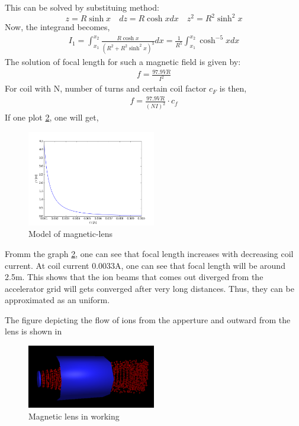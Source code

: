 \documentclass[twocolumn,12pt]{article}
\numberwithin{equation}{section} %
\numberwithin{equation}{section}
\begin{document}
This can be solved by substituing method:
\begin{equation}
z=R\sinh x \quad dz=R\cosh x dx \quad z^2=R^2\sinh^2x
\end{equation}
Now, the integrand becomes,
\begin{align}
    I_1=\int_{x_1}^{x_2}\frac{R\cosh x}{(R^2+R^2\sinh^2x)^3}dx =                 \frac{1}{R^5}\int_{x_1}^{x_2}\cosh^{-5}x dx
    \label{I1}
\end{align}
The solution of focal length for such a magnetic field is given by\cite{booktheory}:
\begin{align}
    f=\frac{97.9VR}{I^2}
\end{align}
For coil with N, number of turns and certain coil factor $c_F$ is then,
\begin{align}
    f=\frac{97.9VR}{(NI)^2} \cdot c_f
    \label{focal}
\end{align}
If one plot \ref{focal}, one will get,

\begin{figure}[H]
    \centering
    \includegraphics[width=0.5\textwidth]{figs/focal length, current relation.png}
    \caption{Model of magnetic-lens \cite{maglens}}
    \label{focal}
\end{figure}

Fromm the graph \ref{focal}, one can see that focal length increases with decreasing coil current. At coil current 0.0033A, one can see that focal length will be around 2.5m. This shows that the ion beams that comes out diverged from the accelerator grid will gets converged after very long distances. Thus, they can be approximated as an uniform. 

The figure depicting the flow of ions from the apperture and outward from the lens is shown in 
\begin{figure}[H]
    \centering
    \includegraphics[width=0.5\textwidth]{results/Simulation.png}
    \caption{Magnetic lens in working}
    \label{focal}
\end{figure}
\end{document}
